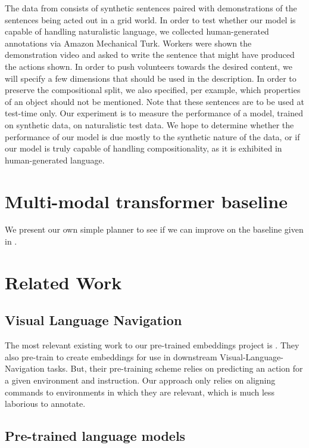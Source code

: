 \documentclass[11pt]{article}
\begin{document}
The data from \citet{ruis2020benchmark} consists of synthetic sentences paired with demonstrations of the sentences being acted out in a grid world.
%
In order to test whether our model is capable of handling naturalistic language, we collected human-generated annotations via Amazon Mechanical Turk.
%
Workers were shown the demonstration video and asked to write the sentence that might have produced the actions shown.
%
In order to push volunteers towards the desired content, we will specify a few dimensions that should be used in the description.
%
In order to preserve the compositional split, we also specified, per example, which properties of an object should not be mentioned.
%
Note that these sentences are to be used at test-time only.
%
Our experiment is to measure the performance of a model, trained on synthetic data, on naturalistic test data.
%
We hope to determine whether the performance of our model is due mostly to the synthetic nature of the data, or if our model is truly capable of handling compositionality, as it is exhibited in human-generated language. 

\section{Multi-modal transformer baseline}
\label{transformer-planner}
We present our own simple planner to see if we can improve on the baseline given in \cite{ruis2020benchmark}.

\section{Related Work}
\subsection{Visual Language Navigation}
The most relevant existing work to our pre-trained embeddings project is \cite{Hao2020TowardsLA}.
%
They also pre-train to create embeddings for use in downstream Visual-Language-Navigation tasks.
%
But, their pre-training scheme relies on predicting an action for a given environment and instruction.
%
Our approach only relies on aligning commands to environments in which they are relevant, which is much less laborious to annotate.

\subsection{Pre-trained language models}
\end{document}
